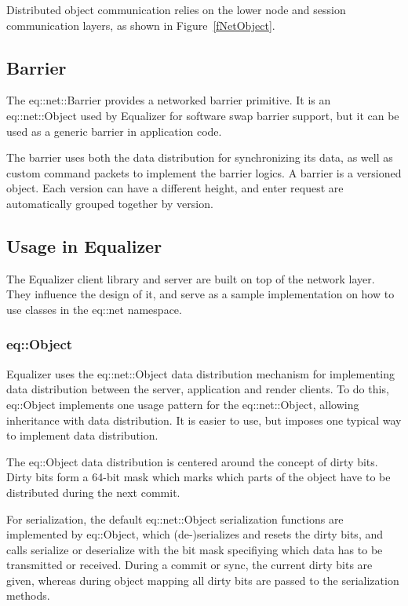 \documentclass[10pt,a4]{scrartcl}
\newcommand{\fig}[1]{Figure~\ref{#1}}
\begin{document}
Distributed object communication relies on the lower node and session
communication layers, as shown in \fig{fNetObject}.

\subsection{Barrier}

The \textsf{eq::net::Barrier} provides a networked barrier primitive. It
is an \textsf{eq::net::Object} used by Equalizer for software swap
barrier support, but it can be used as a generic barrier in application
code.

The barrier uses both the data distribution for synchronizing its data,
as well as custom command packets to implement the barrier logics. A
barrier is a versioned object. Each version can have a different height,
and enter request are automatically grouped together by version.


\subsection{\label{sNetUsage}Usage in Equalizer}

The Equalizer client library and server are built on top of the network
layer. They influence the design of it, and serve as a sample
implementation on how to use classes in the \textsf{eq::net} namespace.

\subsubsection{\label{sEqObject}eq::Object}

Equalizer uses the \textsf{eq::net::Object} data distribution mechanism
for implementing data distribution between the server, application and
render clients. To do this, \textsf{eq::Object} implements one usage
pattern for the \textsf{eq::net::Object}, allowing inheritance with data
distribution. It is easier to use, but imposes one typical way to implement data
distribution.

The \textsf{eq::Object} data distribution is centered around the concept
of dirty bits. Dirty bits form a 64-bit mask which marks which parts of
the object have to be distributed during the next commit.

For serialization, the default \textsf{eq::net::Object} serialization
functions are implemented by \textsf{eq::Object}, which (de-)serializes
and resets the dirty bits, and calls \textsf{serialize} or
\textsf{deserialize} with the bit mask specifiying which data has to be
transmitted or received. During a commit or sync, the current dirty bits
are given, whereas during object mapping all dirty bits are passed to
the serialization methods.
\end{document}
